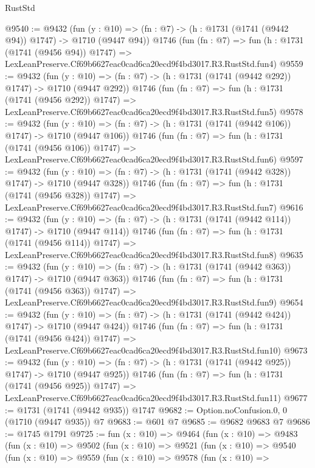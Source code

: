 \begin{lexlean}{RustStd}
\begin{coremodule}
@9540 := @9432
    (fun (y : @10) => (fn : @7) -> (h : @1731 (@1741 (@9442 @94)) @1747) -> @1710 (@9447 @94))
    @1746
    (fun (fn : @7) =>
    fun (h : @1731 (@1741 (@9456 @94)) @1747) =>
    LexLeanPreserve.Cf69b6627eac0cad6ca20ecd9f4bd3017.R3.RustStd.fun4)
@9559 := @9432
    (fun (y : @10) => (fn : @7) -> (h : @1731 (@1741 (@9442 @292)) @1747) -> @1710 (@9447 @292))
    @1746
    (fun (fn : @7) =>
    fun (h : @1731 (@1741 (@9456 @292)) @1747) =>
    LexLeanPreserve.Cf69b6627eac0cad6ca20ecd9f4bd3017.R3.RustStd.fun5)
@9578 := @9432
    (fun (y : @10) => (fn : @7) -> (h : @1731 (@1741 (@9442 @106)) @1747) -> @1710 (@9447 @106))
    @1746
    (fun (fn : @7) =>
    fun (h : @1731 (@1741 (@9456 @106)) @1747) =>
    LexLeanPreserve.Cf69b6627eac0cad6ca20ecd9f4bd3017.R3.RustStd.fun6)
@9597 := @9432
    (fun (y : @10) => (fn : @7) -> (h : @1731 (@1741 (@9442 @328)) @1747) -> @1710 (@9447 @328))
    @1746
    (fun (fn : @7) =>
    fun (h : @1731 (@1741 (@9456 @328)) @1747) =>
    LexLeanPreserve.Cf69b6627eac0cad6ca20ecd9f4bd3017.R3.RustStd.fun7)
@9616 := @9432
    (fun (y : @10) => (fn : @7) -> (h : @1731 (@1741 (@9442 @114)) @1747) -> @1710 (@9447 @114))
    @1746
    (fun (fn : @7) =>
    fun (h : @1731 (@1741 (@9456 @114)) @1747) =>
    LexLeanPreserve.Cf69b6627eac0cad6ca20ecd9f4bd3017.R3.RustStd.fun8)
@9635 := @9432
    (fun (y : @10) => (fn : @7) -> (h : @1731 (@1741 (@9442 @363)) @1747) -> @1710 (@9447 @363))
    @1746
    (fun (fn : @7) =>
    fun (h : @1731 (@1741 (@9456 @363)) @1747) =>
    LexLeanPreserve.Cf69b6627eac0cad6ca20ecd9f4bd3017.R3.RustStd.fun9)
@9654 := @9432
    (fun (y : @10) => (fn : @7) -> (h : @1731 (@1741 (@9442 @424)) @1747) -> @1710 (@9447 @424))
    @1746
    (fun (fn : @7) =>
    fun (h : @1731 (@1741 (@9456 @424)) @1747) =>
    LexLeanPreserve.Cf69b6627eac0cad6ca20ecd9f4bd3017.R3.RustStd.fun10)
@9673 := @9432
    (fun (y : @10) => (fn : @7) -> (h : @1731 (@1741 (@9442 @925)) @1747) -> @1710 (@9447 @925))
    @1746
    (fun (fn : @7) =>
    fun (h : @1731 (@1741 (@9456 @925)) @1747) =>
    LexLeanPreserve.Cf69b6627eac0cad6ca20ecd9f4bd3017.R3.RustStd.fun11)
@9677 := @1731 (@1741 (@9442 @935)) @1747
@9682 := Option.noConfusion.{0, 0} (@1710 (@9447 @935)) @7
@9683 := @601 @7
@9685 := @9682 @9683 @7
@9686 := @1745 @1791
@9725 := fun (x : @10) =>
  @9464
    (fun (x : @10) =>
    @9483
      (fun (x : @10) =>
      @9502
        (fun (x : @10) =>
        @9521
          (fun (x : @10) =>
          @9540
            (fun (x : @10) =>
            @9559
              (fun (x : @10) =>
              @9578
                (fun (x : @10) =>

\end{coremodule}
\end{lexlean}
